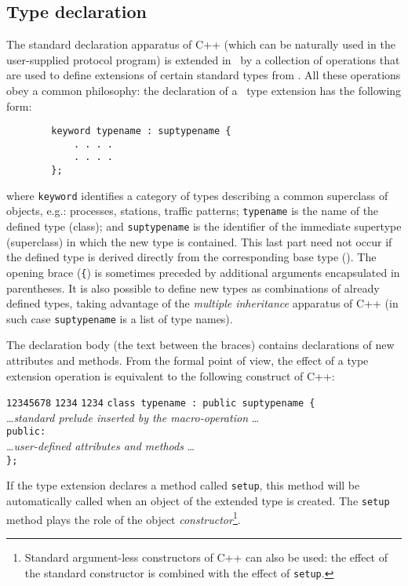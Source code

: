 \subsection{Type declaration}

The standard declaration apparatus of C++ (which can be naturally used in the
user-supplied protocol program) is extended in \smurph\ by a collection of
operations that are used to define extensions of certain
standard types from .
All these operations obey a common philosophy:
the declaration of a \smurph\ type extension has the following form:
{\small
\begin{verbatim}
        keyword typename : suptypename {
            . . . .
            . . . .
        };
\end{verbatim} }
\noindent
where {\tt keyword} identifies a category of types
describing a common superclass of objects, e.g.:
processes, stations, traffic patterns;
{\tt typename} is the name of the defined type (class); and {\tt suptypename} is
the identifier of the immediate supertype (superclass) in which the new
type is contained.
This last part need not occur if the defined type is derived directly from
the corresponding base type ().
The opening brace ({\tt \{}) is sometimes preceded by additional arguments
encapsulated in parentheses.
It is also possible to define new types as combinations of already
defined types, taking advantage of the {\em multiple inheritance\/}
apparatus of C++ (in such case {\tt suptypename} is a list of type names).

The declaration body (the text between the braces)
contains declarations of new attributes and methods.
From the formal point of view, the effect of a type extension operation is
equivalent to the following construct of C++:
{\small
\begin{tabbing}
{\tt 12345678} \= {\tt 1234} \= {\tt 1234} \kill
\> {\tt class typename : public suptypename \{ }\\
\> \> \ldots {\em standard prelude inserted by the macro-operation} \ldots \\
\> \> {\tt public:} \\
\> \> \ldots {\em user-defined attributes and methods} \ldots \\
\> {\tt \};}
\end{tabbing} }

If the type extension declares a method called {\tt setup},
this method will be automatically called when an object of the extended type is
created.
The {\tt setup} method plays the role of the object
{\em constructor\/}\footnote{Standard argument-less
constructors of C++ can also be used:
the effect of the standard constructor is combined with the effect of
{\tt setup}.}.


